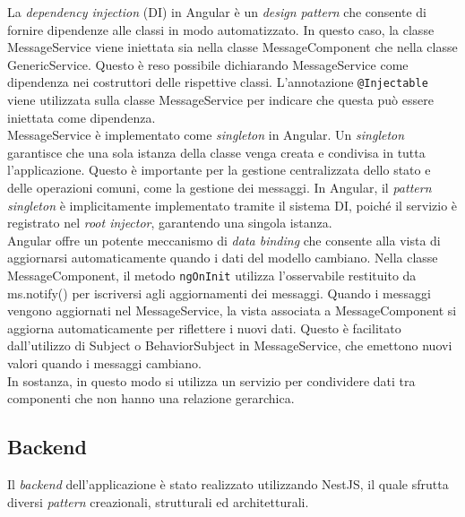 La \textit{dependency injection} (DI) in Angular è un \textit{design pattern} che 
consente di fornire dipendenze alle classi in modo automatizzato. In questo 
caso, la classe MessageService viene iniettata sia nella classe 
MessageComponent che nella classe GenericService.
Questo è reso possibile dichiarando MessageService come dipendenza nei 
costruttori delle rispettive classi.
L'annotazione \texttt{@Injectable} viene utilizzata sulla classe MessageService 
per indicare che questa può essere iniettata come dipendenza.\\
MessageService è implementato come \textit{singleton} in Angular. Un \textit{singleton} garantisce 
che una sola istanza della classe venga creata e condivisa in tutta 
l'applicazione.
Questo è importante per la gestione centralizzata dello stato e delle operazioni 
comuni, come la gestione dei messaggi.
In Angular, il \textit{pattern singleton} è implicitamente implementato tramite il 
sistema DI, poiché il servizio è registrato nel \textit{root injector}, 
garantendo una singola istanza.\\
Angular offre un potente meccanismo di \textit{data binding} che consente alla 
vista di aggiornarsi automaticamente quando i dati del modello cambiano.
Nella classe MessageComponent, il metodo \texttt{ngOnInit} utilizza 
l'osservabile restituito da ms.notify() per iscriversi agli aggiornamenti dei 
messaggi.
Quando i messaggi vengono aggiornati nel MessageService, la vista associata a 
MessageComponent si aggiorna automaticamente per riflettere i nuovi dati.
Questo è facilitato dall'utilizzo di Subject o BehaviorSubject in 
MessageService, che emettono nuovi valori quando i messaggi cambiano.\\
In sostanza, in questo modo si utilizza un servizio per condividere dati tra
componenti che non hanno una relazione gerarchica.



\subsection{Backend}
Il \textit{backend} dell'applicazione è stato realizzato utilizzando NestJS, il quale sfrutta diversi \textit{pattern} creazionali, strutturali ed architetturali.

